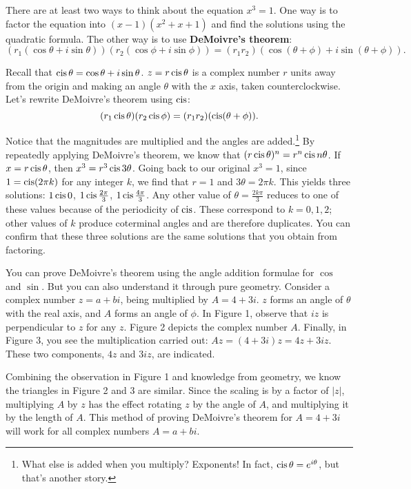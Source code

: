 \documentclass[../textbook.tex]{subfiles}
\begin{document}
There are at least two ways to think about the equation $x^3 = 1$. One way is to factor the equation into $(x-1)(x^2+x+1)$ and find the solutions using the quadratic formula. The other way is to use \textbf{DeMoivre’s theorem}:
\[(r_1 (\cos \theta + i \sin \theta)) (r_2 (\cos \phi + i \sin \phi)) = (r_1r_2) (\cos(\theta + \phi) + i \sin(\theta + \phi)).\]

Recall that $\operatorname{cis} \theta = \cos \theta + i \sin \theta$. $z=r\operatorname{cis} \theta$ is a complex number $r$ units away from the origin and making an angle $\theta$ with the $x$ axis, taken counterclockwise. Let’s rewrite DeMoivre’s theorem using $\operatorname{cis}$:
\[(r_1 \operatorname{cis} \theta)(r_2 \operatorname{cis} \phi) = (r_1r_2)(\operatorname{cis}(\theta + \phi)).\]

\noindent Notice that the magnitudes are multiplied and the angles are added.\footnote{What else is added when you multiply? Exponents! In fact, $\operatorname{cis} \theta = e^{i\theta}$, but that’s another story.} By repeatedly applying DeMoivre's theorem, we know that $(r \operatorname{cis} \theta) ^ n = r^n \operatorname{cis} n\theta$. If $x = r \operatorname{cis} \theta$, then $x^3 = r^3 \operatorname{cis} 3\theta$. Going back to our original $x^3 = 1$, since $1 = \operatorname{cis}(2\pi k)$ for any integer $k$, we find that $r = 1$ and $3\theta = 2\pi k$. This yields three solutions: $1 \operatorname{cis} 0$, $1 \operatorname{cis} \frac{2\pi}{3}$, $1 \operatorname{cis} \frac{4\pi}{3}$. Any other value of $\theta=\frac{2k\pi}{3}$ reduces to one of these values because of the periodicity of $\operatorname{cis}$. These correspond to $k = 0, 1, 2$; other values of $k$ produce coterminal angles and are therefore duplicates. You can confirm that these three solutions are the same solutions that you obtain from factoring.

You can prove DeMoivre’s theorem using the angle addition formulae for $\cos$ and $\sin$. But you can also understand it through pure geometry. Consider a complex number $z = a + bi$, being multiplied by $A = 4 + 3i$. $z$ forms an angle of $\theta$ with the real axis, and $A$ forms an angle of $\phi$. In Figure 1, observe that $iz$ is perpendicular to $z$ for any $z$. Figure 2 depicts the complex number $A$. Finally, in Figure 3, you see the multiplication carried out: $Az = (4+3i)z = 4z + 3iz$. These two components, $4z$ and $3iz$, are indicated.

Combining the observation in Figure 1 and knowledge from geometry, we know the triangles in Figure 2 and 3 are similar. Since the scaling is by a factor of $|z|$, multiplying $A$ by $z$ has the effect rotating $z$ by the angle of $A$, and multiplying it by the length of $A$. This method of proving DeMoivre's theorem for $A=4+3i$ will work for all complex numbers $A=a+bi$.
\end{document}

